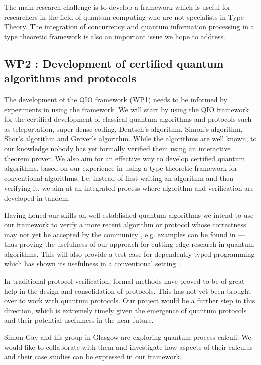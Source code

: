 \documentclass[a4paper]{article}
\begin{document}
The main research challenge is to develop a framework which is useful for
researchers in the field of quantum computing who are not specialists
in Type Theory. The integration of concurrency and quantum information
processing in a type theoretic framework is also an important issue 
we hope to address.

\subsection*{WP2 : Development of certified quantum algorithms and protocols }
\label{sec:wp2}

The development of the QIO framework (WP1) needs to be informed by
experiments in using the framework. 
We will start by using the QIO framework for the
certified development of classical quantum algorithms and protocols
such as teleportation, super dense coding, Deutsch's algorithm,
Simon's algorithm, Shor's algorithm and Grover's algorithm. While the
algorithms are well known, to our knowledge nobody has yet formally
verified them using an interactive theorem prover. We also aim for an
effective way to develop certified quantum algorithms, based on our
experience in using a type theoretic framework for conventional
algorithms. I.e. instead of first writing an algorithm and then
verifying it, we aim at an integrated process where algorithm and
verification are developed in tandem.

Having honed our skills on well established quantum algorithms we
intend to use our framework to verify a more recent algorithm or
protocol whose correctness may not yet be accepted by the community ,
e.g.  examples can be found in  ---
thus proving the usefulness of our approach for cutting edge research
in quantum algorithms. This will also provide a test-case for
dependently typed programming which has shown its usefulness in a
conventional setting .

In traditional protocol verification, formal methods have proved to be
of great help in the design and  consolidation of protocols. This has
not yet been brought over to work with quantum protocols. Our project
would be a further step in this direction, which is extremely timely
given the emergence of quantum protocols and their potential
usefulness in the near future.

Simon Gay and his group in Glasgow are exploring quantum process
calculi. We would like to collaborate with them and investigate how
aspects of their calculus and their case studies can be expressed in
our framework.
\end{document}
